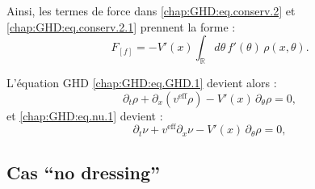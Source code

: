Ainsi, les termes de force dans \eqref{chap:GHD:eq.conserv.2} et \eqref{chap:GHD:eq.conserv.2.1} prennent la forme :
\begin{equation}
	F_{[f]} = -V'(x) \int_{\mathbb{R}} d\theta \, f'(\theta) \, \rho(x, \theta).
\end{equation}

L’équation GHD \eqref{chap:GHD:eq.GHD.1} devient alors :
\begin{equation}\label{chap:GHD:eq.conserv.3.1}
	\partial_t \rho + \partial_x\!\left(v^{\mathrm{eff}} \rho\right) - V'(x) \, \partial_\theta \rho = 0,
\end{equation}
et \eqref{chap:GHD:eq.nu.1} devient :
\begin{equation}\label{chap:GHD:eq.nu.1.1}
	\partial_t \nu + v^{\mathrm{eff}}\partial_x \nu - V'(x) \, \partial_\theta \rho = 0,
\end{equation}



%

\subsection{Cas ``no dressing''}

